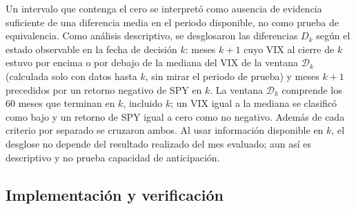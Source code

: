  Un intervalo que contenga el cero se interpretó como ausencia de evidencia suficiente de una diferencia media en el periodo disponible, no como prueba de equivalencia. 
Como análisis descriptivo, se desglosaron las diferencias $D_{k}$ según el estado observable en la fecha de decisión $k$: meses $k+1$ cuyo VIX al cierre de $k$ estuvo por encima o por debajo de la mediana del VIX de la ventana $\mathcal D_k$ (calculada solo con datos hasta $k$, sin mirar el periodo de prueba) y meses $k+1$ precedidos por un retorno negativo de SPY en $k$. La ventana $\mathcal D_k$ comprende los 60 meses que terminan en $k$, incluido $k$; un VIX igual a la mediana se clasificó como bajo y un retorno de SPY igual a cero como no negativo. Además de cada criterio por separado se cruzaron ambos. Al usar información disponible en $k$, el desglose no depende del resultado realizado del mes evaluado; aun así es descriptivo y no prueba capacidad de anticipación.


\subsection{Implementación y verificación}\label{sec:impl}

